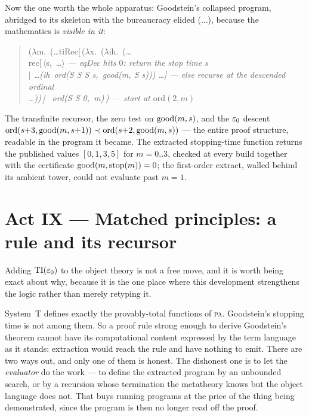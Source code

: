 Now the one worth the whole apparatus: Goodstein's collapsed program,
abridged to its skeleton with the bureaucracy elided ($\ldots$), because the
mathematics is \emph{visible in it}:
\begin{quote}\ttfamily\small
($\lambda$m.\ (\dots tiRec[\,($\lambda$x.\ ($\lambda$ih.\ (\dots\\
\hspace*{1.2em}rec[\,$\langle$s,\ \dots$\rangle$
  \hfill\normalfont\itshape --- eqDec hits $0$: return the stop time $s$\\
\hspace*{1.2em}$\mid$ \dots (ih\ ord(S S S s,\ good(m, S s))) \dots]
  \hfill\normalfont\itshape --- else recurse at the descended ordinal\\
\dots))\,] \ ord(S S 0,\ m)\,)
  \hfill\normalfont\itshape --- start at $\mathrm{ord}(2,m)$
\end{quote}
The transfinite recursor, the zero test on $\operatorname{good}(m,s)$, and the $\varepsilon_0$
descent $\mathrm{ord}(s{+}3, \operatorname{good}(m,s{+}1)) \prec \mathrm{ord}(s{+}2,
\operatorname{good}(m,s))$ --- the entire proof structure, readable in the program it
became. The extracted stopping-time function returns the published values
$[0,1,3,5]$ for $m=0..3$, checked at every build together with the
certificate $\operatorname{good}(m, \mathrm{stop}(m))=0$; the first-order extract, walled
behind its ambient tower, could not evaluate past $m=1$.

\section{Act IX --- Matched principles: a rule and its recursor}

Adding $\mathrm{TI}(\varepsilon_0)$ to the object theory is not a free move, and it is
worth being exact about why, because it is the one place where this
development strengthens the logic rather than merely retyping it.

System~T defines exactly the provably-total functions of \textsc{pa}. Goodstein's
stopping time is not among them. So a proof rule strong enough to derive
Goodstein's theorem cannot have its computational content expressed by the
term language as it stands: extraction would reach the rule and have nothing
to emit. There are two ways out, and only one of them is honest. The
dishonest one is to let the \emph{evaluator} do the work --- to define the
extracted program by an unbounded search, or by a recursion whose termination
the metatheory knows but the object language does not. That buys running
programs at the price of the thing being demonstrated, since the program is
then no longer read off the proof.

